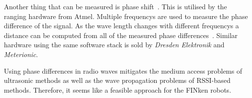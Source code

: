 Another thing that can be measured is phase shift~\cite{2_kluge_eggert_2009}.
This is utilised by the ranging hardware from Atmel.
Multiple frequencys are used to measure the phase difference of the signal.
As the wave length changes with different frequencys a distance can be computed from all of the measured phase differences~\cite{atmelranging}.
Similar hardware using the same software stack is sold by \emph{Dresden Elektronik} and \emph{Meterionic}.

Using phase differences in radio waves mitigates the medium access problems of ultrasonic methods as well as the wave propagation problems of RSSI-based methods.
Therefore, it seems like a feasible approach for the FINken robots.


